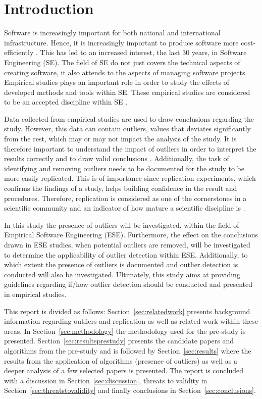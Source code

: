 ﻿\section{Introduction}
\label{sec:introduction}




Software is increasingly important for both national and international infrastructure. Hence, it is increasingly important to produce software more cost-efficiently \citep{sommerville2006software}. This has led to an increased interest, the last 30 years, in Software Engineering (SE). The field of SE do not just covers the technical aspects of creating software, it also attends to the aspects of managing software projects. Empirical studies plays an important role in order to study the effects of developed methods and tools within SE. These empirical studies are considered to be an accepted discipline within SE \citep{ko2013practical}. 


Data collected from empirical studies are used to draw conclusions regarding the study. However, this data can contain outliers, values that deviates significantly from the rest, which may or may not impact the analysis of the study. It is therefore important to understand the impact of outliers in order to interpret the results correctly and to draw valid conclusions \citep{kriegel2008angle}. Additionally, the task of identifying and removing outliers needs to be documented for the study to be more easily replicated. This is of importance since replication experiments, which confirms the findings of a study, helps building confidence in the result and procedures. Therefore, replication is considered as one of the cornerstones in a scientific community and an indicator of how mature a scientific discipline is \citep{brooks2008replication}.


In this study the presence of outliers will be investigated, within the field of Empirical Software Engineering (ESE)\@. Furthermore, the effect on the conclusions drawn in ESE studies, when potential outliers are removed, will be investigated to determine the applicability of outlier detection within ESE\@. Additionally, to which extent the presence of outliers is documented and outlier detection is conducted will also be investigated. Ultimately, this study aims at providing guidelines regarding if\slash how outlier detection should be conducted and presented in empirical studies.


This report is divided as follows: Section~\ref{sec:relatedwork} presents background information regarding outliers and replication as well as related work within these areas. In Section~\ref{sec:methodology} the methodology used for the pre-study is presented. Section~\ref{sec:resultsprestudy} presents the candidate papers and algorithms from the pre-study and is followed by Section~\ref{sec:results} where the results from the application of algorithms (presence of outliers) as well as a deeper analysis of a few selected papers is presented. The report is concluded with a discussion in Section~\ref{sec:discussion}, threats to validity in Section~\ref{sec:threatstovalidity} and finally conclusions in Section~\ref{sec:conclusions}.




